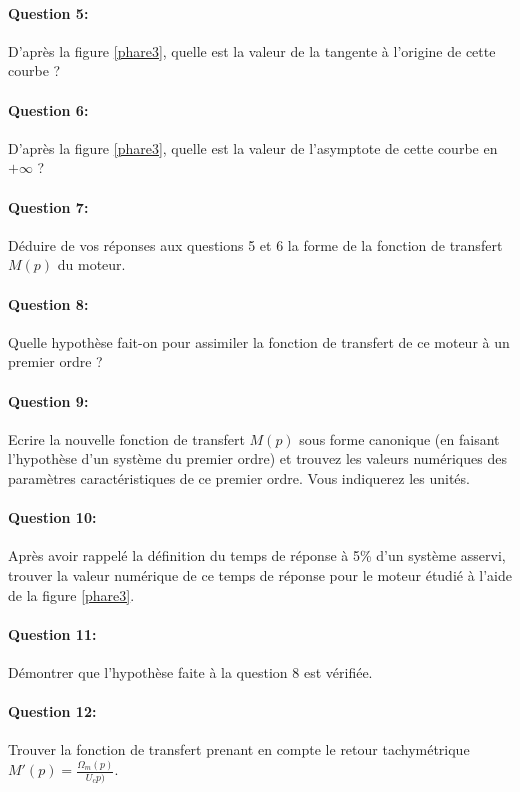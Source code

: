 \paragraph{Question 5:} D'après la figure \ref{phare3}, quelle est la valeur de la tangente à l'origine de cette courbe ?

\paragraph{Question 6:} D'après la figure \ref{phare3}, quelle est la valeur de l'asymptote de cette courbe en $+\infty$ ?

\paragraph{Question 7:} Déduire de vos réponses aux questions 5 et 6 la forme de la fonction de transfert $M(p)$ du moteur.

\paragraph{Question 8:} Quelle hypothèse fait-on pour assimiler la fonction de transfert de ce moteur à un premier ordre ?

\paragraph{Question 9:} Ecrire la nouvelle fonction de transfert $M(p)$ sous forme canonique (en faisant l'hypothèse d'un système du premier ordre) et trouvez les valeurs numériques des paramètres caractéristiques de ce premier ordre. Vous indiquerez les unités.

\paragraph{Question 10:} Après avoir rappelé la définition du temps de réponse à 5\% d'un système asservi, trouver la valeur numérique de ce temps de réponse pour le moteur étudié à l'aide de la figure \ref{phare3}.

\paragraph{Question 11:} Démontrer que l'hypothèse faite à la question 8 est vérifiée.

\paragraph{Question 12:} Trouver la fonction de transfert prenant en compte le retour tachymétrique $M'(p)=\frac{\Omega_m(p)}{U_c p)}$.

